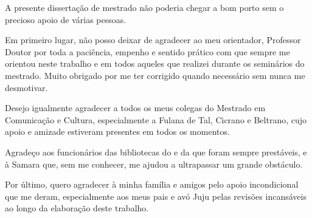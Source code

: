 \begin{agradecimentos}
    {
    A presente dissertação de mestrado não poderia chegar a bom porto sem o precioso apoio de várias pessoas.
    
    Em primeiro lugar, não posso deixar de agradecer ao meu orientador, Professor Doutor \orientador\quad por toda a paciência, empenho e sentido prático com que sempre me orientou neste trabalho e em todos aqueles que realizei durante os seminários do mestrado. Muito obrigado por me ter corrigido quando necessário sem nunca me desmotivar.

    Desejo igualmente agradecer a todos os meus colegas do Mestrado em Comunicação e Cultura, especialmente a Fulana de Tal, Cicrano e Beltrano, cujo apoio e amizade estiveram presentes em todos os momentos.
    
    Agradeço aos funcionários das bibliotecas do \centro\quad e da \instituicao\quad que foram sempre prestáveis, e à Samara que, sem me conhecer, me ajudou a ultrapassar um grande obstáculo.
    
    Por último, quero agradecer à minha família e amigos pelo apoio incondicional que me deram, especialmente aos meus pais e avó Juju pelas revisões incansáveis ao longo da elaboração deste trabalho.
    }
\end{agradecimentos}